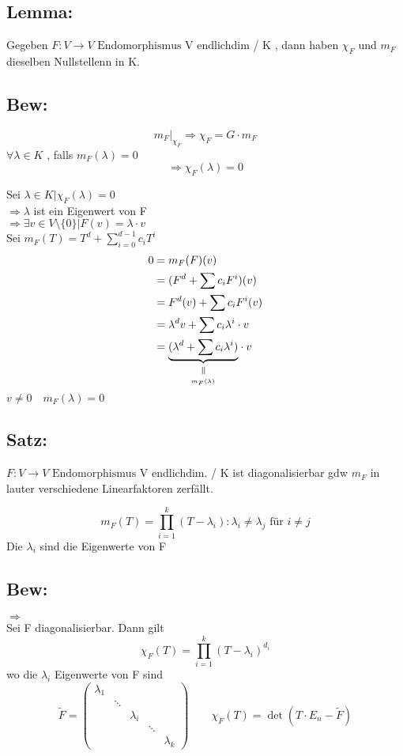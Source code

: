 \documentclass[titlepage,12pt,a4paper,ngerman]{report}
\newcommand{\verteq}{\rotatebox{90}{$\,=$}}
\newcommand{\equalto}[2]{\underset{\scriptstyle\overset{\mkern4mu\verteq}{#2}}{#1}}
\newcommand{\tx}[1]{\textrm{#1}}
\newcommand{\ub}[1]{\underbrace{#1}}
\newcommand{\enph}{F: V \to V \textrm{ Endomorphismus}}
\begin{document}
\subsection{Lemma:}
Gegeben $\enph$ V endlichdim / K , dann haben $\chi_F$ und $m_F$ dieselben Nullstellenn in K.
\subsection{Bew:}
$$m_F|_{\chi_F} \Rightarrow \chi_F = G \cdot m_F$$
$\forall \lambda \in K$ , falls $m_F(\lambda) = 0$
$$ \Rightarrow \chi_F(\lambda) = 0$$

Sei $\lambda \in K | \chi_F(\lambda) = 0$\\
$\Rightarrow \lambda$ ist ein Eigenwert von F \\
$\Rightarrow \exists v \in V\setminus \{0\} | F(v) = \lambda\cdot v$\\
Sei $m_F(T) = T^d + \sum_{i=0}^{d-1} c_i T^i$\\
\begin{align*}
0 &= m_F(F) (v)\\
&= (F^d + \sum c_i F^i)(v)\\
&= F^d(v) + \sum c_i F^i(v) \\
&= \lambda^d v + \sum c_i \lambda^i \cdot v\\
&= \equalto{\ub{(\lambda^d + \sum c_i \lambda^i)}}{_{m_F(\lambda)}} \cdot v
\end{align*}
$v\neq 0 \quad m_F(\lambda) = 0$

\subsection{Satz:}
$\enph$ V endlichdim. / K ist diagonalisierbar gdw $m_F$ in lauter verschiedene Linearfaktoren zerfällt.

$$m_F(T) = \prod_{i=1}^{k} (T-\lambda_i) : \lambda_i \neq \lambda_j \tx{ für } i\neq j $$
Die $\lambda_i$ sind die Eigenwerte von F
\subsection{Bew:}
$ \boxed{\Rightarrow} $\\
Sei F diagonalisierbar. Dann gilt 
$$\chi_F(T) = \prod_{i=1}^{k} (T-\lambda_i)^{d_i}$$
wo die $ \lambda_i $ Eigenwerte von F sind
$$ \tilde{F} = \begin{pmatrix}
\lambda_1 \\
& \ddots\\
& & \lambda_i \\
& & & \ddots\\
& & & & \lambda_k
\end{pmatrix} \qquad \chi_F(T) = \det(T\cdot E_n - \tilde{F})$$
\end{document}
